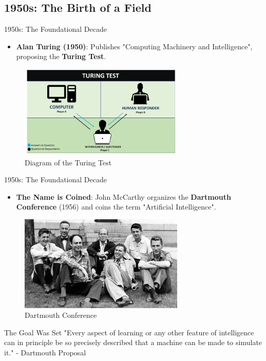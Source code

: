 \documentclass{beamer}
\begin{document}
\subsection{1950s: The Birth of a Field}

\begin{frame}[t]{1950s: The Foundational Decade}
    \begin{itemize}
        \item \textbf{Alan Turing (1950)}: Publishes "Computing Machinery and Intelligence", proposing the \textbf{Turing Test}.
    \end{itemize}
    \begin{figure}
        \includegraphics[width=0.7\textwidth]{images/turing-test.png}
        \caption{Diagram of the Turing Test}
    \end{figure}
\end{frame}

\begin{frame}[t]{1950s: The Foundational Decade}
    \begin{itemize}
        \item \textbf{The Name is Coined}: John McCarthy organizes the \textbf{Dartmouth Conference} (1956) and coins the term "Artificial Intelligence".
    \end{itemize}
    \begin{figure}
        \includegraphics[width=0.7\textwidth]{images/Dartmouth-1956-Conference.jpg}
        \caption{Dartmouth Conference}
    \end{figure}

    \begin{block}{The Goal Was Set}
        "Every aspect of learning or any other feature of intelligence can in principle be so precisely described that a machine can be made to simulate it." - Dartmouth Proposal
    \end{block}
\end{frame}
\end{document}
